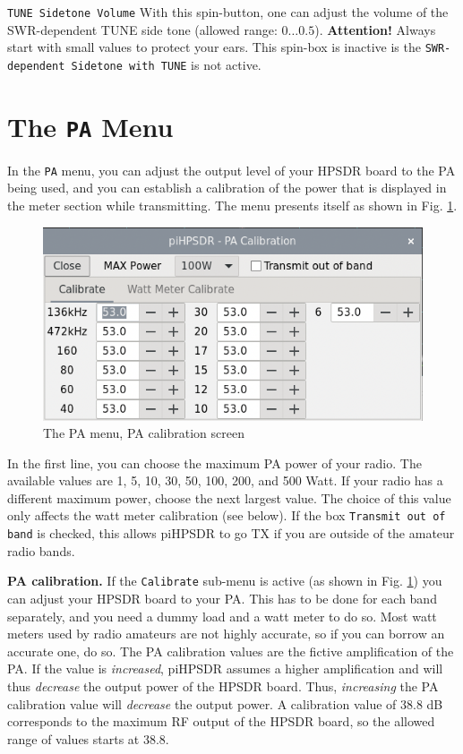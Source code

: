 \documentclass[12pt]{book}
\def\rett#1{\texttt{\color{red}#1}}
\def\bltt#1{\texttt{\color{blue}#1}}
\def\pH{pi\-HPSDR\xspace}
\begin{document}
\rett{TUNE Sidetone Volume} With this spin-button, one can adjust the volume of the SWR-dependent TUNE side tone
(allowed range: $0 \ldots 0.5$). \textbf{Attention!} Always start with small values to protect your ears.
This spin-box is inactive is the \rett{SWR-dependent Sidetone with TUNE} is not active.

\clearpage
\section{The \texttt{PA} Menu}

In the \bltt{PA} menu, you can adjust the output level of your HPSDR board
to the PA being used, and you can establish a calibration of the
power that is displayed in the meter section while transmitting.
The menu presents itself as shown in Fig. \ref{fig:PAMenuCalibrate}.

\begin{figure}[ht]
\center
\includegraphics[scale=0.45]{PAmenuCalibrate.png}
\caption{The PA menu, PA calibration screen}
\label{fig:PAMenuCalibrate}
\end{figure}

In the first line, you can choose the maximum PA power of your
radio. The available values are 1, 5, 10, 30, 50, 100, 200, and
500 Watt. If your radio has a different maximum power, choose the
next largest value. The choice of this value only affects the
watt meter calibration (see below). If the  box
\rett{Transmit out of band} is checked, this allows \pH
to go TX if you are outside of the amateur radio bands.



\textbf{PA calibration.} If the \rett{Calibrate} sub-menu is active
(as shown in Fig. \ref{fig:PAMenuCalibrate}) you can adjust your
HPSDR board to your PA. This has to be done for each band separately,
and you need a dummy load and a watt meter to do so. Most watt meters
used by radio amateurs are not highly accurate, so if you can borrow
an accurate one, do so. The PA calibration values are the fictive
amplification of the PA. If the value is \textit{increased},
\pH assumes a higher amplification and will thus \textit{decrease}
the output power of the HPSDR board. Thus, \textit{increasing} the
PA calibration value will \textit{decrease} the output power. A calibration
value of 38.8 dB corresponds to the maximum RF output of the HPSDR board,
so the allowed range of values starts at 38.8.
\end{document}
